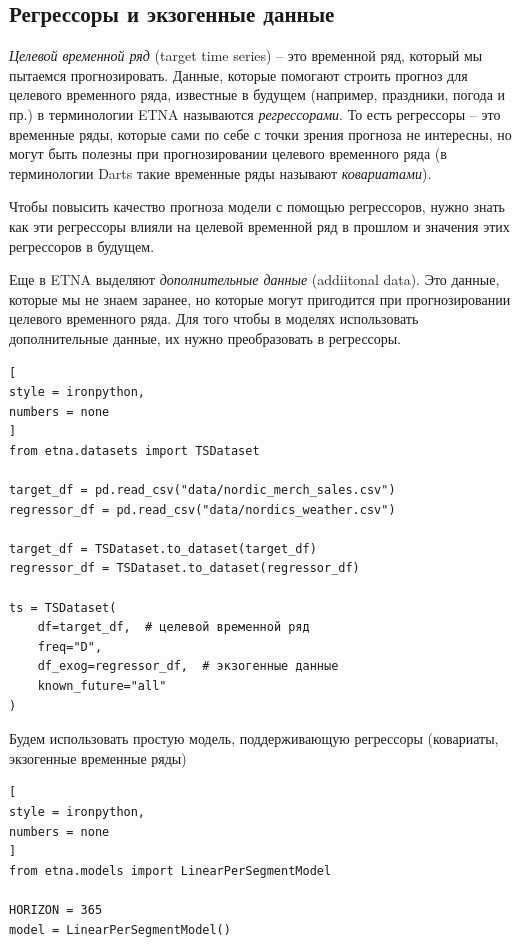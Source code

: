 \documentclass[%
	11pt,
	a4paper,
	utf8,
		]{article}
\begin{document}
\subsection{Регрессоры и экзогенные данные}

\emph{Целевой временной ряд} (target time series) -- это временной ряд, который мы пытаемся прогнозировать. Данные, которые помогают строить прогноз для целевого временного ряда, известные в будущем (например, праздники, погода и пр.) в терминологии ETNA называются \emph{регрессорами}. То есть регрессоры -- это временные ряды, которые сами по себе с точки зрения прогноза не интересны, но могут быть полезны при прогнозировании целевого временного ряда (в терминологии Darts такие временные ряды называют \emph{ковариатами}).

Чтобы повысить качество прогноза модели с помощью регрессоров, нужно знать как эти регрессоры влияли на целевой временной ряд в прошлом и значения этих регрессоров в будущем.

Еще в ETNA выделяют \emph{дополнительные данные} (addiitonal data). Это данные, которые мы не знаем заранее, но которые могут пригодится при прогнозировании целевого временного ряда. Для того чтобы в моделях использовать дополнительные данные, их нужно преобразовать в регрессоры.

\begin{lstlisting}[
style = ironpython,
numbers = none
]
from etna.datasets import TSDataset

target_df = pd.read_csv("data/nordic_merch_sales.csv")
regressor_df = pd.read_csv("data/nordics_weather.csv")

target_df = TSDataset.to_dataset(target_df)
regressor_df = TSDataset.to_dataset(regressor_df)

ts = TSDataset(
    df=target_df,  # целевой временной ряд
    freq="D",
    df_exog=regressor_df,  # экзогенные данные
    known_future="all"
)
\end{lstlisting}

Будем использовать простую модель, поддерживающую регрессоры (ковариаты, экзогенные временные ряды)
\begin{lstlisting}[
style = ironpython,
numbers = none
]
from etna.models import LinearPerSegmentModel

HORIZON = 365
model = LinearPerSegmentModel()
\end{lstlisting}
\end{document}
